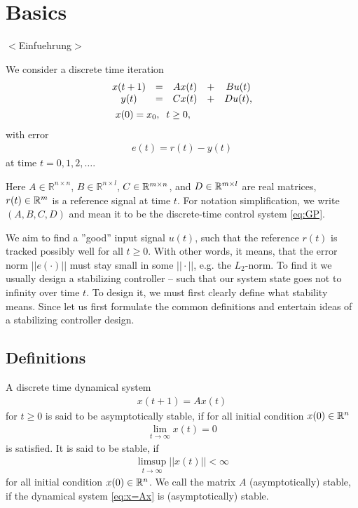 \chapter{Basics} 
\label{ch:Basics}
{\color{red}$<$Einfuehrung$>$}

We consider a  discrete time iteration
\begin{align}
\label{eq:GP}
\begin{split}
&\begin{array}{c c c c c}
x(t+1) &= &A x(t)& + &B u(t)  \\
y ( t) &= &C x(t)&  + &D u(t),\\ 
\end{array}\\
&\; \;\;x(0) =x_0 , \; \;  t \geq 0,
\end{split}
\end{align}
 with error 
\begin{align}
\label{eq:error}
e(t) =r(t) - y(t)
\end{align}
at time $t  = 0, 1, 2, \dots$.

Here $A \in \mathbb{R}^{n\times n}$, $B \in \mathbb{R}^{n \times l}$, $C \in {\mathbb{R}}^{m \times n}$, and $D \in {\mathbb{R}}^{m\times l}$ are real matrices, $r(t) \in {\mathbb{R}}^{m}$ is a reference signal at time $t$. For notation simplification, we write $(A, B,C,D)$ and mean it to be the discrete-time control system \eqref{eq:GP}.



We aim to find a ''good'' input signal $u(t)$, such that the reference $r(t)$ is tracked possibly well for all $t \geq 0$. With other words, it means, that the error norm $||e(\cdot)||$ must stay small in some  $||\cdot||$, e.g. the $L_2$-norm.
To find it we usually design a stabilizing controller 
 -- such that our system state goes not to infinity over time $t$. 
To design it, we must first clearly define what stability means. Since let us first formulate the common definitions and entertain ideas of a stabilizing controller design. 

\section{Definitions}

\begin{defi}
	A discrete time dynamical system
	\begin{align}
	\label{eq:x=Ax}
	x(t+1) = A x(t)
	\end{align}
	for $t \geq 0$ 
	is said to be asymptotically stable, if for all initial condition $x(0) \in {\mathbb{R}}^n$
	\begin{align}
	\lim_{t \to \infty} x(t) = 0
	\end{align}	
    is satisfied. 
	It is said to be stable, if 
	\begin{align}
	\limsup_{t \to \infty} ||x(t)|| < \infty
	\end{align}
	for all	 initial condition $x(0) \in {\mathbb{R}}^n$.
	We call the matrix $A$ (asymptotically) stable, if the dynamical system \eqref{eq:x=Ax} is (asymptotically) stable.
\end{defi}


